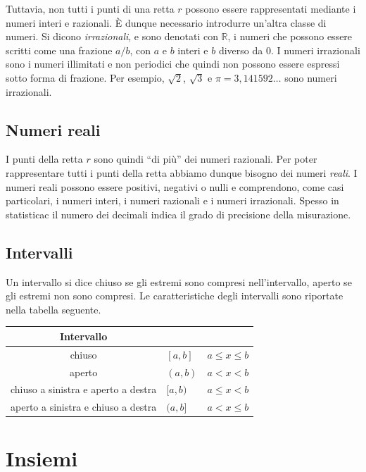 \documentclass[
  11pt,
]{krantz}
\theoremstyle{definition}
\theoremstyle{definition}
\theoremstyle{definition}
\theoremstyle{definition}
\theoremstyle{remark}
\begin{document}
Tuttavia, non tutti i punti di una retta \(r\) possono essere rappresentati mediante i numeri interi e razionali. È dunque necessario introdurre un'altra classe di numeri. Si dicono \emph{irrazionali}, e sono denotati con \(\mathbb{R}\), i numeri che possono essere scritti come una frazione \(a / b\), con \(a\) e \(b\) interi e \(b\) diverso da 0. I numeri irrazionali sono i numeri illimitati e non periodici che quindi non possono essere espressi sotto forma di frazione. Per esempio, \(\sqrt{2}\), \(\sqrt{3}\) e \({\displaystyle \pi =3,141592\ldots}\) sono numeri irrazionali.

\hypertarget{numeri-reali}{%
\section{Numeri reali}\label{numeri-reali}}

I punti della retta \(r\) sono quindi ``di più'' dei numeri razionali. Per poter rappresentare tutti i punti della retta abbiamo dunque bisogno dei numeri \emph{reali}. I numeri reali possono essere positivi, negativi o nulli e comprendono, come casi particolari, i numeri interi, i numeri razionali e i numeri irrazionali. Spesso in statisticac il numero dei decimali indica il grado di precisione della misurazione.

\hypertarget{intervalli}{%
\section{Intervalli}\label{intervalli}}

Un intervallo si dice chiuso se gli estremi sono compresi nell'intervallo, aperto se gli estremi non sono compresi. Le caratteristiche degli intervalli sono riportate nella tabella seguente.

\begin{longtable}[]{@{}cll@{}}
\toprule
Intervallo & & \\
\midrule
\endhead
chiuso & \([a, b]\) & \(a \leq x \leq b\) \\
aperto & \((a, b)\) & \(a < x < b\) \\
chiuso a sinistra e aperto a destra & \([a, b)\) & \(a \leq x < b\) \\
aperto a sinistra e chiuso a destra & \((a, b]\) & \(a < x \leq b\) \\
\bottomrule
\end{longtable}

\hypertarget{insiemistica}{%
\chapter{Insiemi}\label{insiemistica}}
\end{document}
